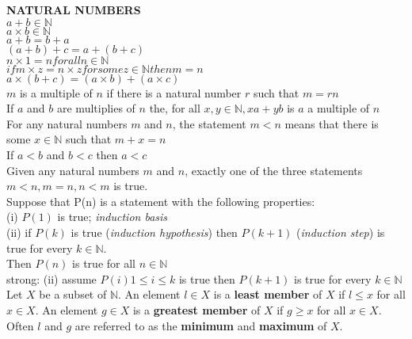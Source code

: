 \documentclass[10pt,landscape]{article}
\begin{document}
\raggedright
\footnotesize
\begin{multicols}{4}


\setlength{\premulticols}{1pt}
\setlength{\postmulticols}{1pt}
\setlength{\multicolsep}{1pt}
\setlength{\columnsep}{2pt}

\textbf{NATURAL NUMBERS}\\
$a+b \in \mathbb{N}$\\
$a \times b \in \mathbb{N}$\\
$a + b = b + a$\\
$(a + b) + c = a + (b + c)$\\
$n \times 1 = n for all n \in \mathbb{N}$\\
$if m \times z = n \times z for some z \in \mathbb{N} then m = n$\\
$a \times (b + c) = (a \times b) + (a \times c)$\\
$m$ is a multiple of $n$ if there is a natural number $r$ such that $m = rn$\\
If $a$ and $b$ are multiplies of $n$ the, for all $x, y \in \mathbb{N}, xa + yb$ is $a$ a multiple of $n$\\
For any natural numbers $m$ and $n$, the statement $m < n$ means that there is some $x \in \mathbb{N}$ such that $m + x = n$\\
If $a < b$ and $b < c$ then $a < c$\\
Given any natural numbers $m$ and $n$, exactly one of the three
statements $m<n, m=n, n<m$ is true.\\
Suppose that P(n) is a statement with the following properties:\\
(i) $P(1)$ is true; \textit{induction basis}\\
(ii) if $P(k)$ is true (\textit{induction hypothesis}) then $P(k+1)$ (\textit{induction step}) is true for every $k \in \mathbb{N}$.\\ 
Then $P(n)$ is true for all $n \in \mathbb{N}$\\
strong: (ii) assume $P(i) 1 \leq i \leq k$ is true then $P(k+1)$ is true for every $k \in \mathbb{N}$\\
Let $X$ be a subset of $\mathbb{N}$. An element $l \in X$ is a \textbf{least member} of $X$ if $l \leq x$ for all $x \in X$. An element $g \in X$ is a \textbf{greatest member} of $X$ if $g \geq x$ for all $x \in X$. Often $l$ and $g$ are referred to as the \textbf{minimum} and \textbf{maximum} of $X$.\\

\end{multicols}
\end{document}
